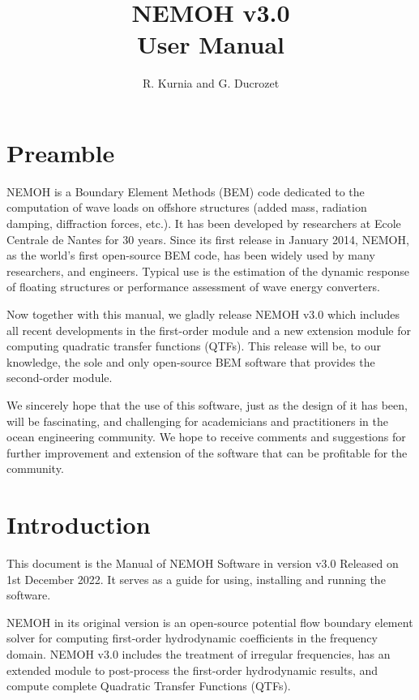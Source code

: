 \documentclass[12pt,a4paper,titlepage]{article}
\begin{document}
\title{NEMOH v3.0\\
User Manual}
\author{R. Kurnia and G. Ducrozet}
\maketitle

\section*{Preamble}
NEMOH is a Boundary Element Methods (BEM) code dedicated to the computation of wave loads on offshore structures (added mass, radiation damping, diffraction forces, etc.). It has been developed by researchers at Ecole Centrale de Nantes for 30 years. Since its first release in January 2014, NEMOH, as the world's first open-source BEM code, has been widely used by many researchers, and engineers. Typical use is the estimation of the dynamic response of floating structures or performance assessment of wave energy converters.

Now together with this manual, we gladly release NEMOH v3.0 which includes all recent developments in the first-order module and a new extension module for computing quadratic transfer functions (QTFs). This release will be, to our knowledge, the sole and only open-source BEM software that provides the second-order module.

We sincerely hope that the use of this software, just as the design of it has been, will be fascinating, and challenging for academicians and practitioners in the ocean engineering community. We hope to receive comments and suggestions for further improvement and extension of the software that can be profitable for the community.
\newpage
\tableofcontents
\newpage
\section{Introduction}

This document is the Manual of NEMOH Software in version v3.0 Released on 1st December 2022. It serves as a guide for using, installing and running the software.

NEMOH in its original version is an open-source potential flow boundary element solver for computing first-order hydrodynamic coefficients in the frequency domain. NEMOH v3.0 includes the treatment of irregular frequencies, has an extended module to post-process the first-order hydrodynamic results, and compute complete Quadratic Transfer Functions (QTFs).\\
\end{document}
